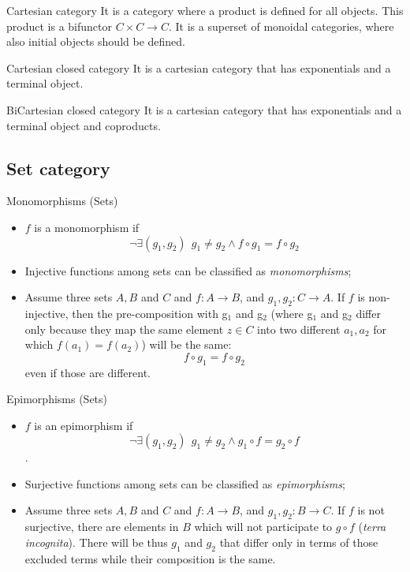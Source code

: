 \documentclass[presentation]{beamer}
\begin{document}
\begin{frame}[label={sec:org6adf220}]{Cartesian category}
It is a category where a product is defined for all objects. This product is a
bifunctor \(C \times C \rightarrow C\). It is a superset of monoidal categories,
where also initial objects should be defined.
\end{frame}

\begin{frame}[label={sec:org326b848}]{Cartesian closed category}
It is a cartesian category that has exponentials and a terminal object.
\end{frame}

\begin{frame}[label={sec:orgb35d5fd}]{BiCartesian closed category}
It is a cartesian category that has exponentials and a terminal object and coproducts.
\end{frame}

\subsection{Set category}
\label{sec:orgd1e3d83}
\begin{frame}[label={sec:org9051813}]{Monomorphisms (Sets)}
\begin{itemize}
\item \(f\) is a monomorphism if $$\neg\exists (g_1, g_2) ~~ g_1 \neq g_2 \wedge f \circ g_1 = f \circ g_2$$

\item Injective functions among sets can be classified as \emph{monomorphisms};

\item \alert{Assume} three sets \(A,B\) and \(C\) and \(f: A \rightarrow B\), and \(g_1, g_2 : C \rightarrow A\).
If \(f\) is non-injective, then the pre-composition with g\(_{\text{1}}\) and g\(_{\text{2}}\) (where g\(_{\text{1}}\) and g\(_{\text{2}}\)
differ only because they map the same element \(z \in C\) into two different \(a_1,
  a_2\) for which \(f(a_1) = f(a_2)\)) will be the same: $$f \circ g_1 = f \circ g_2$$ even if those are different.
\end{itemize}
\end{frame}

\begin{frame}[label={sec:orgf6ca006}]{Epimorphisms (Sets)}
\begin{itemize}
\item \(f\) is an epimorphism if $$\neg\exists (g_1, g_2) ~~ g_1 \neq g_2 \wedge g_1 \circ f = g_2
  \circ f$$.

\item Surjective functions among sets can be classified as \emph{epimorphisms};

\item \alert{Assume} three sets \(A,B\) and \(C\) and \(f: A \rightarrow B\), and \(g_1, g_2: B \rightarrow C\).
If \(f\) is not surjective, there are elements in \(B\) which will not participate
to \(g \circ f\) (\emph{terra incognita}). There will be thus \(g_1\) and \(g_2\) that differ only in
terms of those excluded terms while their composition is the same.
\end{itemize}
\end{frame}
\end{document}

